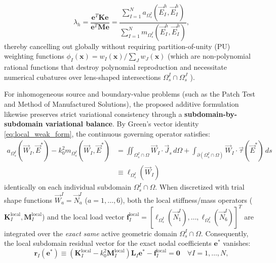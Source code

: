 \documentclass[preprint,12pt]{elsarticle}
\begin{document}
\begin{equation}
    \lambda_h = \frac{\mathbf{e}^T \mathbf{K} \mathbf{e}}{\mathbf{e}^T \mathbf{M} \mathbf{e}} = \frac{\sum_{I=1}^N a_{\Omega_s^I}(\vec{E}_I^h, \vec{E}_I^h)}{\sum_{I=1}^N m_{\Omega_s^I}(\vec{E}_I^h, \vec{E}_I^h)},
    \label{eq:rayleigh_quotient_overlap}
\end{equation}
thereby cancelling out globally without requiring partition-of-unity (PU) weighting functions $\phi_I(\mathbf{x}) = w_I(\mathbf{x}) / \sum_J w_J(\mathbf{x})$ (which are non-polynomial rational functions that destroy polynomial reproduction and necessitate numerical cubatures over lens-shaped intersections $\Omega_s^I \cap \Omega_s^J$ \cite{de2000method, nicomedes2021acoustic}).

For inhomogeneous source and boundary-value problems (such as the Patch Test and Method of Manufactured Solutions), the proposed additive formulation likewise preserves strict variational consistency through a \textbf{subdomain-by-subdomain variational balance}. By Green's vector identity \eqref{eq:local_weak_form}, the continuous governing operator satisfies:
\begin{equation}
    \begin{aligned}
        a_{\Omega_s^I}(\vec{W}_I, \vec{E}^*) - k_0^2 m_{\Omega_s^I}(\vec{W}_I, \vec{E}^*) & = \iint_{\Omega_s^I \cap \Omega} \vec{W}_I \cdot \vec{J}_s \, d\Omega + \int_{\partial(\Omega_s^I \cap \Omega)} \vec{W}_I \cdot \vec{\tau}(\vec{E}^*) \, ds \\
                                                                                      & \equiv \ell_{\Omega_s^I}(\vec{W}_I)
    \end{aligned}
    \label{eq:local_variational_balance}
\end{equation}
identically on each individual subdomain $\Omega_s^I \cap \Omega$. When discretized with trial shape functions $\vec{W}_a^I = \vec{N}_a^I$ ($a=1,\dots,6$), both the local stiffness/mass operators ($\mathbf{K}_I^{\mathrm{local}}, \mathbf{M}_I^{\mathrm{local}}$) and the local load vector $\mathbf{f}_I^{\mathrm{local}} = [\ell_{\Omega_s^I}(\vec{N}_1^I), \dots, \ell_{\Omega_s^I}(\vec{N}_6^I)]^T$ are integrated over the \emph{exact same} active geometric domain $\Omega_s^I \cap \Omega$. Consequently, the local subdomain residual vector for the exact nodal coefficients $\mathbf{e}^*$ vanishes:
\begin{equation}
    \mathbf{r}_I(\mathbf{e}^*) \equiv (\mathbf{K}_I^{\mathrm{local}} - k_0^2 \mathbf{M}_I^{\mathrm{local}}) \mathbf{L}_I \mathbf{e}^* - \mathbf{f}_I^{\mathrm{local}} = \mathbf{0} \quad \forall I = 1, \dots, N,
    \label{eq:subdomain_residual_zero}
\end{equation}
\end{document}
